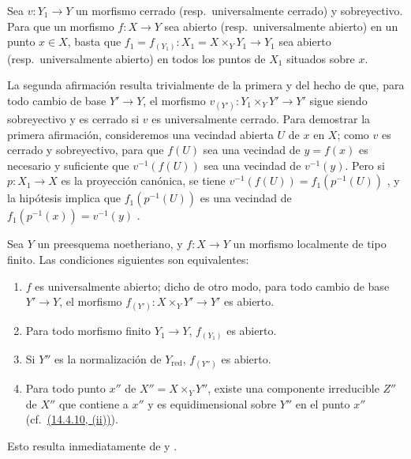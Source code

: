 \begin{lemma}[14.4.8.1]
\label{IV.14.4.8.1}
Sea $v:Y_1\to Y$ un morfismo cerrado \textup{(resp.}\ universalmente cerrado\textup{)} y sobreyectivo.
Para que un morfismo $f:X\to Y$ sea abierto \textup{(resp.}\ universalmente abierto\textup{)} en un punto $x\in X$, basta que $f_1=f_{(Y_1)}:X_1=X\times_Y Y_1\to Y_1$ sea abierto \textup{(resp.}\ universalmente abierto\textup{)} en todos los puntos de $X_1$ situados sobre $x$.
\end{lemma}

La segunda afirmación resulta trivialmente de la primera y del hecho de que, para todo cambio de base $Y'\to Y$, el morfismo $v_{(Y')}:Y_1\times_Y Y'\to Y'$ sigue siendo sobreyectivo y es cerrado si $v$ es universalmente cerrado.
Para demostrar la primera afirmación, consideremos
una vecindad abierta $U$ de $x$ en $X$; como $v$ es cerrado y sobreyectivo, para que $f(U)$ sea una vecindad de $y=f(x)$ es necesario y suficiente que $v^{-1}(f(U))$ sea una vecindad de $v^{-1}(y)$.
Pero si $p:X_1\to X$ es la proyección canónica, se tiene $v^{-1}(f(U))=f_1(p^{-1}(U))$ , y la hipótesis implica que $f_1(p^{-1}(U))$ es una vecindad de $f_1(p^{-1}(x))=v^{-1}(y)$ .

\begin{corollary}[14.4.9]
\label{IV.14.4.9}
Sea $Y$ un preesquema noetheriano, y $f:X\to Y$ un morfismo localmente de tipo finito.
Las condiciones siguientes son equivalentes:
\begin{enumerate}[label=\emph{\alph*)}]
  \item $f$ es universalmente abierto; dicho de otro modo, para \textup{todo} cambio de base $Y'\to Y$, el morfismo $f_{(Y')}:X\times_Y Y'\to Y'$ es abierto.
  \item[\emph{a$'$)}] Para todo morfismo \textup{finito} $Y_1\to Y$, $f_{(Y_1)}$ es abierto.
  \item[\emph{a$''$)}] Si $Y''$ es la \textup{normalización} de $Y_{\mathrm{red}}$, $f_{(Y'')}$ es abierto.
  \item Para todo punto $x''$ de $X''=X\times_Y Y''$, existe una componente irreducible $Z''$ de $X''$ que contiene a $x''$ y es equidimensional sobre $Y''$ en el punto $x''$ \textup{(cf.\ {\hyperlink{ega4.c04.item.14-4-10}{(14.4.10, (ii))}})}.
\end{enumerate}
\end{corollary}

Esto resulta inmediatamente de  y .

